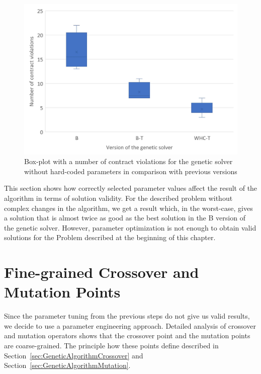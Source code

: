 \begin{figure}
	\centering
	\includegraphics[width=\textwidth]{images/BoxPlotSolverNoHardcodedTuning.pdf}
	\caption[Box-plot with a number of contract violations for the genetic solver without hardcoded parameters in comparison with previous versions]{Box-plot with a number of contract violations for the genetic solver without hard-coded parameters in comparison with previous versions}
	\label{fig:boxplotsolverNoHardcodedTuning}
\end{figure}

This section shows how correctly selected parameter values affect the result of the algorithm in terms of solution validity. For the described problem without complex changes in the algorithm, we get a result which, in the worst-case, gives a solution that is almost twice as good as the best solution in the B version of the genetic solver. However, parameter optimization is not enough to obtain valid solutions for the Problem described at the beginning of this chapter. 

\section{Fine-grained Crossover and Mutation Points}\label{sec:NP}

Since the parameter tuning from the previous steps do not give us valid results, we decide to use a parameter engineering approach.
Detailed analysis of crossover and mutation operators shows that the crossover point and the mutation points are coarse-grained. The principle how these points define described in Section~\ref{sec:GeneticAlgorithmCrossover} and Section~\ref{sec:GeneticAlgorithmMutation}.

